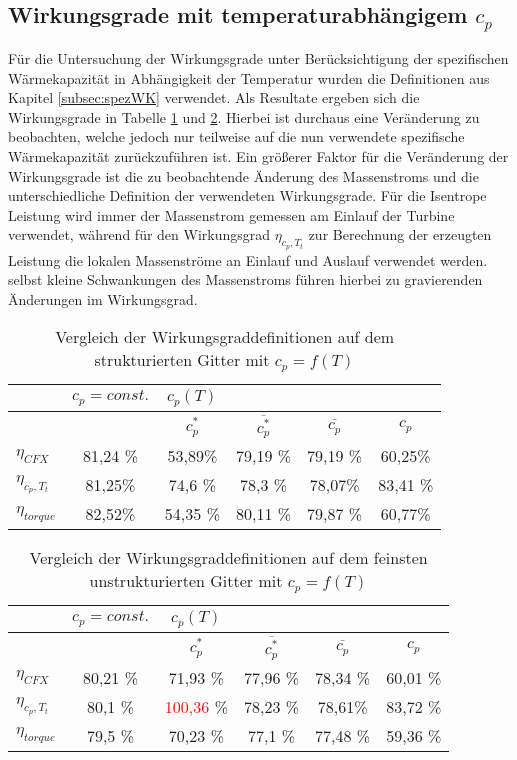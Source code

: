 \subsection{Wirkungsgrade mit temperaturabhängigem $c_p$}
\begin{table}[H]
	Für die Untersuchung der Wirkungsgrade unter Berücksichtigung der spezifischen Wärmekapazität in Abhängigkeit der Temperatur wurden die Definitionen aus Kapitel \ref{subsec:spezWK} verwendet. 
	Als Resultate ergeben sich die Wirkungsgrade in Tabelle \ref{tab:strukturiertmycp} und \ref{tab:unstrukturiertmycp}. Hierbei ist durchaus eine Veränderung zu beobachten, welche jedoch nur teilweise auf die nun verwendete spezifische Wärmekapazität zurückzuführen ist. Ein größerer Faktor für die Veränderung der Wirkungsgrade ist die zu beobachtende Änderung des Massenstroms und die unterschiedliche Definition der verwendeten Wirkungsgrade. Für die Isentrope Leistung wird immer der Massenstrom gemessen am Einlauf der Turbine verwendet, während für den Wirkungsgrad $\eta_{c_p, T_t}$ zur Berechnung der erzeugten Leistung die lokalen Massenströme an Einlauf und Auslauf verwendet werden. selbst kleine Schwankungen des Massenstroms führen hierbei zu gravierenden Änderungen im Wirkungsgrad.
	
	\centering
	\caption{Vergleich der Wirkungsgraddefinitionen auf dem strukturierten Gitter mit $c_p = f(T)$}
	\begin{tabular}{ l| c | c c c c}
		&	$c_p = const.$	&	$c_p(T)$	&		&		&		\\
		\hline
		&		&	$c_p^*$	&	$\overline{c_p^*}$	&	$\overline{c_p}$	&	$c_p$	\\
		\hline
		$\eta_{CFX}$	&	81,24 \%	&	53,89\%	&	79,19 \%	&	79,19 \%	&	60,25\%	\\
		$\eta_{c_p, T_t}$	&	81,25\%	&	74,6 \%	&	78,3 \%	&	78,07\%	&	83,41 \%	\\
	$\eta_{torque}$	&	82,52\%	&	54,35 \%	&	80,11 \%	&	79,87 \%	&	60,77\%	\\
		
	\end{tabular}
	\label{tab:strukturiertmycp}
\end{table}

\begin{table}[H]
	\centering
	\caption{Vergleich der Wirkungsgraddefinitionen auf dem feinsten unstrukturierten Gitter mit $c_p = f(T)$}
	\begin{tabular}{ l| c | c c c c}
		&	$c_p = const.$	&	$c_p(T)$	&		&		&		\\
		\hline
		&		&$c_p^*$	&	$\overline{c_p^*}$	&	$\overline{c_p}$	&	$c_p$	\\
		\hline
		$\eta_{CFX}$	&	80,21 \%	&	71,93 \%	&	77,96 \%	&	78,34 \%	&	60,01 \%	\\
		$\eta_{c_p, T_t}$	&	80,1 \%	&	\textcolor{red}{100,36} \%	&	78,23 \%	&	78,61\%	&	83,72 \%	\\
		$\eta_{torque}$	&	79,5 \%	&	70,23 \%	&	77,1 \%	&	77,48 \%	&	59,36 \%	\\
		
	\end{tabular}
	\label{tab:unstrukturiertmycp}
\end{table}